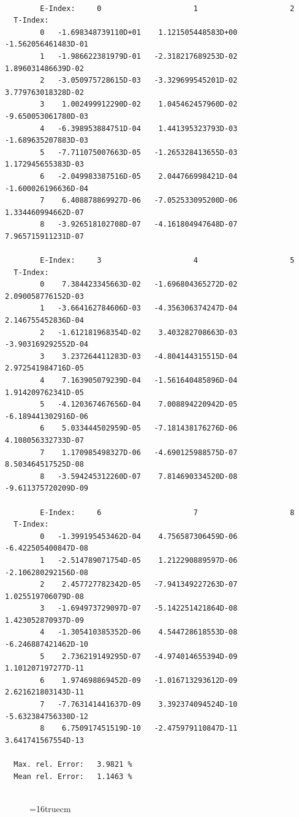 \documentclass[12pt,dvips]{article}
\begin{document}
\begin{small}\begin{verbatim}

        E-Index:     0                     1                     2
  T-Index:
        0   -1.698348739110D+01    1.121505448583D+00   -1.562056461483D-01
        1   -1.986622381979D-01   -2.318217689253D-02    1.896031486639D-02
        2   -3.050975728615D-03   -3.329699545201D-02    3.779763018328D-02
        3    1.002499912290D-02    1.045462457960D-02   -9.650053061780D-03
        4   -6.398953884751D-04    1.441395323793D-03   -1.689635207883D-03
        5   -7.711075007663D-05   -1.265328413655D-03    1.172945655383D-03
        6   -2.049983387516D-05    2.044766998421D-04   -1.600026196636D-04
        7    6.408878869927D-06   -7.052533095200D-06    1.334460994662D-07
        8   -3.926518102708D-07   -4.161804947648D-07    7.965715911231D-07

        E-Index:     3                     4                     5
  T-Index:
        0    7.384423345663D-02   -1.696804365272D-02    2.090058776152D-03
        1   -3.664162784606D-03   -4.356306374247D-04    2.146755452836D-04
        2   -1.612181968354D-02    3.403282708663D-03   -3.903169292552D-04
        3    3.237264411283D-03   -4.804144315515D-04    2.972541984716D-05
        4    7.163905079239D-04   -1.561640485896D-04    1.914209762341D-05
        5   -4.120367467656D-04    7.008894220942D-05   -6.189441302916D-06
        6    5.033444502959D-05   -7.181438176276D-06    4.108056332733D-07
        7    1.170985498327D-06   -4.690125988575D-07    8.503464517525D-08
        8   -3.594245312260D-07    7.814690334520D-08   -9.611375720209D-09

        E-Index:     6                     7                     8
  T-Index:
        0   -1.399195453462D-04    4.756587306459D-06   -6.422505400847D-08
        1   -2.514789071754D-05    1.212290889597D-06   -2.106280292156D-08
        2    2.457727782342D-05   -7.941349227263D-07    1.025519706079D-08
        3   -1.694973729097D-07   -5.142251421864D-08    1.423052870937D-09
        4   -1.305410385352D-06    4.544728618553D-08   -6.246887421462D-10
        5    2.736219149295D-07   -4.974014655394D-09    1.101207197277D-11
        6    1.974698869452D-09   -1.016713293612D-09    2.621621803143D-11
        7   -7.763141441637D-09    3.392374094524D-10   -5.632384756330D-12
        8    6.750917451519D-10   -2.475979110847D-11    3.641741567554D-13

  Max. rel. Error:   3.9821 %
  Mean rel. Error:   1.1463 %


\end{verbatim}\end{small}
\begin{figure} \label{7.2a}
\epsfxsize=16truecm
\end{figure}
\newpage
\end{document}
